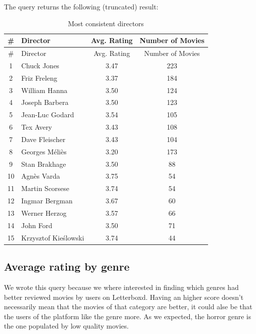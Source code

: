 \documentclass{Configuration_Files/PoliMi3i_thesis}
\begin{document}
The query returns the following (truncated) result:

\begin{longtable}[!h]{|c|l|c|c|}
\caption{Most consistent directors} \\
\hline
\# & Director & Avg. Rating & Number of Movies \\
\hline
\endfirsthead
\hline
\# & Director & Avg. Rating & Number of Movies \\
\hline
\endhead
\hline
\endfoot
\hline
\endlastfoot

1 & Chuck Jones        & 3.47 & 223 \\
2 & Friz Freleng       & 3.37 & 184 \\
3 & William Hanna      & 3.50 & 124 \\
4 & Joseph Barbera     & 3.50 & 123 \\
5 & Jean-Luc Godard    & 3.54 & 105 \\
6 & Tex Avery          & 3.43 & 108 \\
7 & Dave Fleischer     & 3.43 & 104 \\
8 & Georges Méliès     & 3.20 & 173 \\
9 & Stan Brakhage      & 3.50 & 88  \\
10 & Agnès Varda       & 3.75 & 54  \\
11 & Martin Scorsese   & 3.74 & 54  \\
12 & Ingmar Bergman    & 3.67 & 60  \\
13 & Werner Herzog     & 3.57 & 66  \\
14 & John Ford         & 3.50 & 71  \\
15 & Krzysztof Kieślowski & 3.74 & 44  \\
\end{longtable}

\subsection{Average rating by genre}

We wrote this query because we where interested in finding which genres had better reviewed movies by users on Letterboxd. Having an higher score doesn't necessarily mean that the movies of that category are better, it could alse be that the users of the platform like the genre more.
As we expected, the horror genre is the one populated by low quality movies.

\inputminted[frame=single,framesep=10pt,breaklines]{cypher}{letterboxd/queries/query3.cypher}
\end{document}
